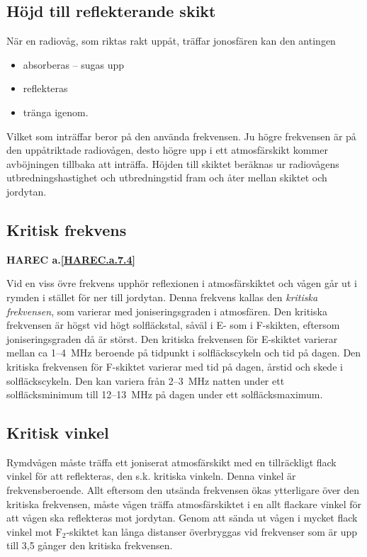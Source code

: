 \subsection{Höjd till reflekterande skikt}

När en radiovåg, som riktas rakt uppåt, träffar jonosfären kan den antingen
\begin{itemize}
  \item absorberas -- sugas upp
  \item reflekteras
  \item tränga igenom.
\end{itemize}

Vilket som inträffar beror på den använda frekvensen.
Ju högre frekvensen är på den uppåtriktade radiovågen, desto högre upp i ett
atmosfärskikt kommer avböjningen tillbaka att inträffa.
Höjden till skiktet beräknas ur radiovågens utbredningshastighet och
utbredningstid fram och åter mellan skiktet och jordytan.

\subsection{Kritisk frekvens}
\textbf{
HAREC a.\ref{HAREC.a.7.4}\label{myHAREC.a.7.4}
}

Vid en viss övre frekvens upphör reflexionen i atmosfärskiktet och
vågen går ut i rymden i stället för ner till jordytan.
Denna frekvens kallas den \emph{kritiska frekvensen}, som varierar med
joniseringsgraden i atmosfären.
Den kritiska frekvensen är högst vid högt solfläckstal, såväl i E- som i
F-skikten, eftersom joniseringsgraden då är störst.
Den kritiska frekvensen för E-skiktet varierar mellan ca 1--4~MHz beroende på
tidpunkt i solfläckscykeln och tid på dagen.
Den kritiska frekvensen för F-skiktet varierar med tid på dagen, årstid och
skede i solfläckscykeln.
Den kan variera från 2--3~MHz natten under ett solfläcksminimum till 12--13~MHz
på dagen under ett solfläcksmaximum.

\subsection{Kritisk vinkel}

Rymdvågen måste träffa ett joniserat atmosfärskikt med en tillräckligt
flack vinkel för att reflekteras, den s.k. kritiska vinkeln.
Denna vinkel är frekvensberoende.
Allt eftersom den utsända frekvensen ökas ytterligare över den kritiska
frekvensen, måste vågen träffa atmosfärskiktet i en allt flackare vinkel för att
vågen ska reflekteras mot jordytan.
Genom att sända ut vågen i mycket flack vinkel
mot \(\mathrm{F_2}\)-skiktet kan långa distanser överbryggas vid
frekvenser som är upp till 3,5 gånger den kritiska frekvensen.

